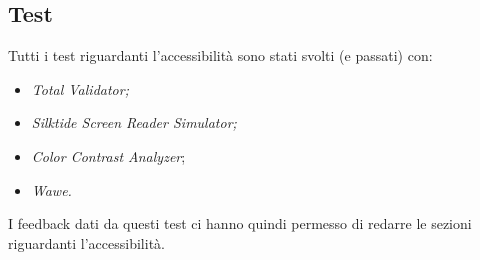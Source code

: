 \bigskip

\begin{center}
\end{center}
\subsection{Test}

Tutti i test riguardanti l’accessibilità sono stati svolti (e passati) con:
\begin{itemize}
\item \textit{Total Validator;}
\item \textit{Silktide Screen Reader Simulator;}
\item \textit{Color Contrast Analyzer};
\item \textit{Wawe.}
\end{itemize}

I feedback dati da questi test ci hanno quindi permesso di redarre le sezioni riguardanti l'accessibilità.

